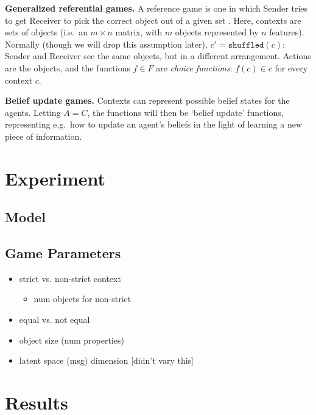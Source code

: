 \documentclass[11pt,a4paper]{article}
\newcommand{\nbSST}[1]{{\leavevmode\color{violet}{\scriptsize#1}}}
\begin{document}
\noindent \textbf{Generalized referential games.}  A reference game is one in which Sender tries to get Receiver to pick the correct object out of a given set \citep{Skyrms2010, Lazaridou2017, Lazaridou2018, Havrylov2017, Chaabouni2019a}.  Here, contexts are sets of objects (i.e.\ an $m \times n$ matrix, with $m$ objects represented by $n$ features).  Normally (though we will drop this assumption later), $c' = \texttt{shuffled}(c)$: Sender and Receiver see the same objects, but in a different arrangement. Actions are the objects, and the functions $f \in F$ are \emph{choice functions}: $f(c) \in c$ for every context $c$.

\noindent \textbf{Belief update games.}  Contexts can represent possible belief states for the agents.  Letting $A = C$, the functions will then be `belief update' functions, representing e.g.\ how to update an agent's beliefs in the light of learning a new piece of information. \nbSST{What should we cite here? Something from dynamic semantics?}

\section{Experiment}

\subsection{Model}

\subsection{Game Parameters}

\begin{itemize}
	\item strict vs. non-strict context
		\begin{itemize}
			\item num objects for non-strict
		\end{itemize}
	\item equal vs. not equal
	\item object size (num properties)
	\item latent space (msg) dimension [didn't vary this]
\end{itemize}

\section{Results}
\end{document}
